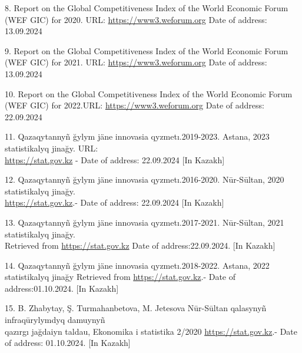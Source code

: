 \begin{references}
8. Report on the Global Competitiveness Index of the World Economic
Forum (WEF GIC) for 2020. URL:
\href{https://www3.weforum.org/docs/WEF_TheGlobalCompetitivenessReport2020.pdf-}{https://www3.weforum.org}
Date of address: 13.09.2024

9. Report on the Global Competitiveness Index of the World Economic
Forum (WEF GIC) for 2021. URL:
\href{https://www3.weforum.org/docs/WEF_Annual_Report_2020_21.pdf.-}{https://www3.weforum.org} Date
of address: 13.09.2024

10. Report on the Global Competitiveness Index of the World Economic
Forum (WEF GIC) for 2022.URL:
\href{https://www3.weforum.org/docs/WEF_Annual_Report_2021_22.pdf.-}{https://www3.weforum.org} Date
of address: 22.09.2024

11. Qazaqytannyñ ğylym jäne innovasia qyzmetı.2019-2023. Astana, 2023
statistikalyq jinağy. URL:\\
\href{https://stat.gov.kz/upload/iblock/226/1i3i3s3o3tuvvsquto0ujj0usfnji43c/\%D0\%A1-05-\%D0\%93\%20(\%D0\%BA\%D0\%B0\%D0\%B7).pdf}{https://stat.gov.kz}
- Date of address: 22.09.2024 {[}In Kazakh{]}

12. Qazaqytannyñ ğylym jäne innovasia qyzmetı.2016-2020. Nūr-Sūltan,
2020 statistikalyq jinağy.\\
\href{https://stat.gov.kz/publication/collections/?year=2020&name=16307&period=year}{https://stat.gov.kz}.-
Date of address: 22.09.2024 {[}In Kazakh{]}

13. Qazaqytannyñ ğylym jäne innovasia qyzmetı.2017-2021. Nūr-Sūltan,
2021 statistikalyq jinağy. \\Retrieved from
\href{https://stat.gov.kz/publication/collections/?year=2021&name=16307&period.-}{https://stat.gov.kz}
Date of address:22.09.2024. {[}In Kazakh{]}

14. Qazaqytannyñ ğylym jäne innovasia qyzmetı.2018-2022. Astana, 2022
statistikalyq jinağy Retrieved from
\href{https://stat.gov.kz/upload/iblock/e4a/5014j9iccdo5z0witso6spfpdbhx49ra/\%D0\%A1-10-\%D0\%93\%20(\%D0\%BA\%D0\%B0\%D0\%B7-\%D1\%80\%D1\%83\%D1\%81\%D1\%81).pdf}{https://stat.gov.kz}.-
Date of address:01.10.2024. {[}In Kazakh{]}

15. B. Zhabytay, Ş. Turmahanbetova, M. Jetesova Nūr-Sūltan qalasynyñ
infraqūrylymdyq damuynyñ \\qazırgı jağdaiyn taldau, Ekonomika i statistika
2/2020
\href{https://stat.gov.kz/upload/iblock/734/vh3mvklrnbsb6iluk2319fjas4sqcmn0/\%D0\%AD\%D0\%B8\%D0\%A1\%202\%202020.pdf}{https://stat.gov.kz}.-
Date of address: 01.10.2024. {[}In Kazakh{]}
\end{references}

